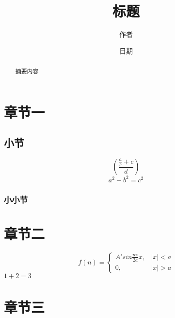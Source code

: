 \documentclass[a4paper,10pt]{article}
\begin{document}
   \title{标题}
   \author{作者}
   \date{日期}
   \maketitle
   \newpage
   \tableofcontents{}
   \begin{abstract}
   	摘要内容
   \end{abstract}
   \newpage
   \section{章节一}
   \subsection{小节}
   $$\left(\frac{{\frac ab +c}}{d}\right)$$
   $$a^2+b^2=c^2$$

   \subsubsection{小小节}
    \newpage
   \section{章节二}
 $$f(n) = \begin{cases}
 	 A'sin{\frac{n\pi}{2a}x}, &|x|<a\\
 	 0, &|x|>a
   \end{cases}$$
   $1+2=3$
   \section{章节三}
 
\end{document}
